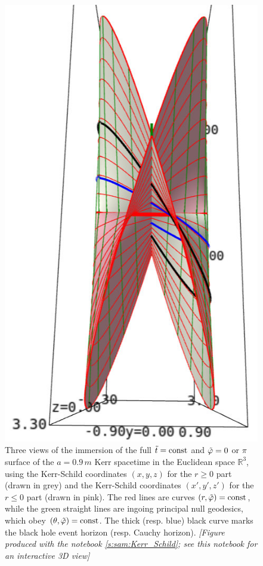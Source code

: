 \begin{figure}
\begin{minipage}[c]{0.33\textwidth}
\end{minipage}
\hfill
\begin{minipage}[c]{0.2\textwidth}
\includegraphics[height=0.3\textheight]{ksm_2_sheets_top.jpg}
\end{minipage}
\caption[]{\label{f:ksm:2_sheets} \footnotesize
Three views of the
immersion of the full ${\tilde t}=\mathrm{const}$ and ${\tilde\varphi}=0$ or $\pi$ surface of the $a=0.9\, m$
Kerr spacetime in the Euclidean space $\mathbb{R}^3$, using the Kerr-Schild coordinates
$(x,y,z)$ for the $r\geq 0$ part (drawn in grey) and the Kerr-Schild coordinates
$(x',y',z')$ for the $r\leq 0$ part (drawn in pink). The red lines are curves
$(r,{\tilde\varphi})=\mathrm{const}$, while the green straight lines are ingoing principal null
geodesics, which obey $(\theta,{\tilde\varphi}) = \mathrm{const}$. The thick (resp. blue) black curve marks the black hole event horizon (resp. Cauchy horizon).
\textsl{[Figure produced with the notebook \ref{s:sam:Kerr_Schild}; see this notebook
for an interactive 3D view]}
}
\end{figure}



